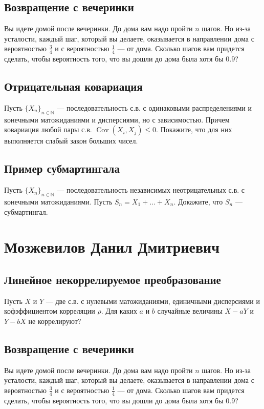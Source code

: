 \documentclass[12pt]{article}
\newcommand\N{\mathbb{N}}
\DeclareMathOperator{\Cov}{Cov}
\begin{document}
\subsection{Возвращение с вечеринки}

Вы идете домой после вечеринки. До дома вам надо пройти $n$ шагов. Но из-за усталости, каждый шаг, который вы делаете, оказывается в направлении дома с вероятностью $\frac{3}{4}$ и с вероятностью $\frac{1}{4}$ --- от дома. Сколько шагов вам придется сделать, чтобы вероятность того, что вы дошли до дома была хотя бы $0.9$?

\subsection{Отрицательная ковариация}

Пусть $\{X_n\}_{n \in \N}$ --- последовательность с.в. с одинаковыми распределениями и конечными матожиданиями и дисперсиями, но с зависимостью. Причем ковариация любой пары с.в. $\Cov(X_i, X_j) \le 0$. Покажите, что для них выполняется слабый закон больших чисел.


\subsection{Пример субмартингала}

Пусть $\{X_n\}_{n \in \N}$ --- последовательность независимых неотрицательных с.в. с конечными матожиданиями. Пусть $S_n = X_1 + \dots + X_n$. Докажите, что $S_n$ --- субмартингал.

\newpage
\section{Мозжевилов Данил Дмитриевич}

\subsection{Линейное некоррелируемое преобразование}

Пусть $X$ и $Y$ --- две с.в. с нулевыми матожиданиями, единичными дисперсиями и кофэффициентом корреляции $\rho$. Для каких $a$ и $b$ случайные величины $X - aY$ и $Y - bX$ не коррелируют?


\subsection{Возвращение с вечеринки}

Вы идете домой после вечеринки. До дома вам надо пройти $n$ шагов. Но из-за усталости, каждый шаг, который вы делаете, оказывается в направлении дома с вероятностью $\frac{3}{4}$ и с вероятностью $\frac{1}{4}$ --- от дома. Сколько шагов вам придется сделать, чтобы вероятность того, что вы дошли до дома была хотя бы $0.9$?
\end{document}
